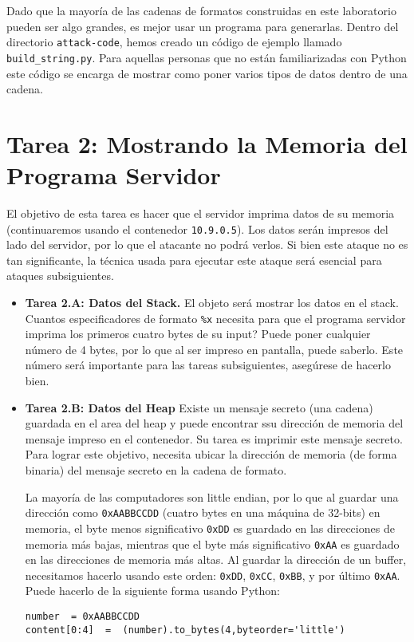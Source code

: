 Dado que la mayoría de las cadenas de formatos construidas en este laboratorio pueden ser algo grandes, es mejor usar un programa para generarlas. Dentro del directorio  \texttt{attack-code}, hemos creado un código de ejemplo llamado  \texttt{build\_string.py}. Para aquellas personas que no están familiarizadas con Python este código se encarga de mostrar como poner varios tipos de datos dentro de una cadena.



\section{Tarea 2: Mostrando la Memoria del Programa Servidor}

El objetivo de esta tarea es hacer que el servidor imprima datos de su memoria (continuaremos usando el contenedor \texttt{10.9.0.5}).
Los datos serán impresos del lado del servidor, por lo que el atacante no podrá verlos. Si bien este ataque no es tan significante, la técnica usada para ejecutar este ataque será esencial para ataques subsiguientes.


\begin{itemize} 
\item \textbf{Tarea 2.A: Datos del Stack.}
El objeto será mostrar los datos en el stack.
Cuantos especificadores de formato \texttt{\%x} necesita para que el programa servidor imprima los primeros cuatro bytes de su input? Puede poner cualquier número de 4 bytes, por lo que al ser impreso en pantalla, puede saberlo.
Este número será importante para las tareas subsiguientes, asegúrese de hacerlo bien.

\item \textbf{Tarea 2.B: Datos del Heap} 
Existe un mensaje secreto (una cadena) guardada en el area del heap y puede encontrar ssu dirección de memoria del mensaje impreso en el contenedor.
Su tarea es imprimir este mensaje secreto.
Para lograr este objetivo, necesita ubicar la dirección de memoria (de forma binaria) del mensaje secreto en la cadena de formato.

La mayoría de las computadores son little endian, por lo que al guardar una dirección como \texttt{0xAABBCCDD} (cuatro bytes en una máquina de 32-bits) en memoria, el byte menos significativo \texttt{0xDD} es guardado en las direcciones de memoria más bajas, mientras que el byte más significativo \texttt{0xAA} es guardado en las direcciones de memoria más altas. 
Al guardar la dirección de un buffer, necesitamos hacerlo usando este orden: \texttt{0xDD}, \texttt{0xCC}, \texttt{0xBB}, y por último \texttt{0xAA}.
Puede hacerlo de la siguiente forma usando Python:

\begin{lstlisting}
number  = 0xAABBCCDD
content[0:4]  =  (number).to_bytes(4,byteorder='little')
\end{lstlisting}
     
\end{itemize} 





